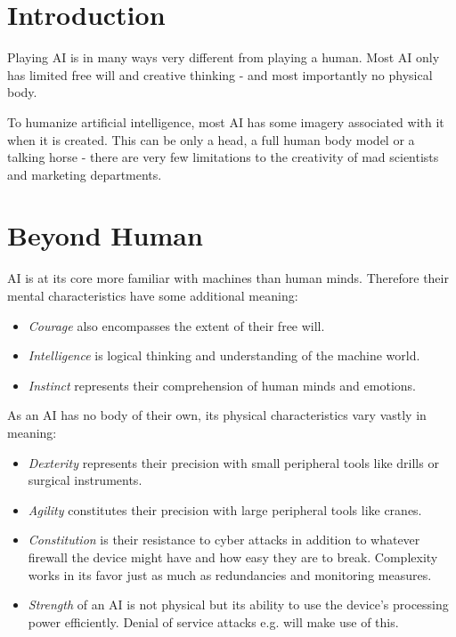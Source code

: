 \documentclass[12pt,a4paper,openany,usenames,dvipsnames]{book}
\begin{document}
	

	\chapter{Introduction}
	Playing AI is in many ways very different from playing a human. Most AI only has limited free will and creative thinking - and most importantly no physical body.
	\par
	To humanize artificial intelligence, most AI has some imagery associated with it when it is created.
	This can be only a head, a full human body model or a talking horse
		- there are very few limitations to the creativity of mad scientists and marketing departments.

	\chapter{Beyond Human}
	\vspace{-8mm} %
	AI is at its core more familiar with machines than human minds. Therefore their mental characteristics have some additional meaning:
	\vspace{-8mm}
	\begin{itemize}
		\setlength\itemsep{-8mm}
		\item \emph{Courage} also encompasses the extent of their free will.
		\item \emph{Intelligence} is logical thinking and understanding of the machine world.
		\item \emph{Instinct} represents their comprehension of human minds and emotions.
	\end{itemize}

	As an AI has no body of their own, its physical characteristics vary vastly in meaning:
	\vspace{-8mm}
	\begin{itemize}
		\setlength\itemsep{-8mm}
		\item \emph{Dexterity} represents their precision with small peripheral tools like drills or surgical instruments.
		\item \emph{Agility} constitutes their precision with large peripheral tools like cranes.
		\item \emph{Constitution} is their resistance to cyber attacks in addition to whatever firewall the device might have and how easy they are to break. Complexity works in its favor just as much as redundancies and monitoring measures.
		\item \emph{Strength} of an AI is not physical but its ability to use the device’s processing power efficiently. Denial of service attacks e.g. will make use of this.
	\end{itemize}
\end{document}
